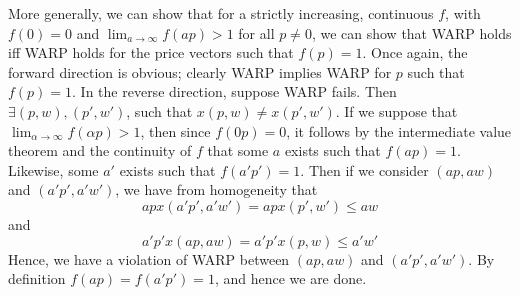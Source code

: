 \documentclass[10pt,letter]{article}
\begin{document}
More generally, we can show that for a strictly increasing, continuous $f$, with $f(0) = 0$ and $\lim_{a \to \infty} f(ap) > 1$ for all $p \neq 0$, we can show that WARP holds iff WARP holds for the price vectors such that $f(p) = 1$. Once again, the forward direction is obvious; clearly WARP implies WARP for $p$ such that $f(p) = 1$. In the reverse direction, suppose WARP fails. Then $\exists (p,w), (p',w')$, such that $x(p,w) \neq x(p',w')$. If we suppose that $
\lim_{\alpha \to \infty} f(\alpha p) > 1$, then since $f(0p) = 0$, it follows by the intermediate value theorem and the continuity of $f$ that some $a$ exists such that $f(ap) = 1$. Likewise, some $a'$ exists such that $f(a'p') = 1$. Then if we consider $(ap, aw)$ and $(a'p', a'w')$, we have from homogeneity that
\[ ap x(a'p', a'w') =  ap x(p',w') \le a w \]
and
\[ a'p' x(ap, aw) = a'p' x(p,w) \le a'w' \]
Hence, we have a violation of WARP between $(ap, aw)$ and $(a'p', a'w')$. By definition $f(ap) = f(a'p') = 1$, and hence we are done.
\end{document}
